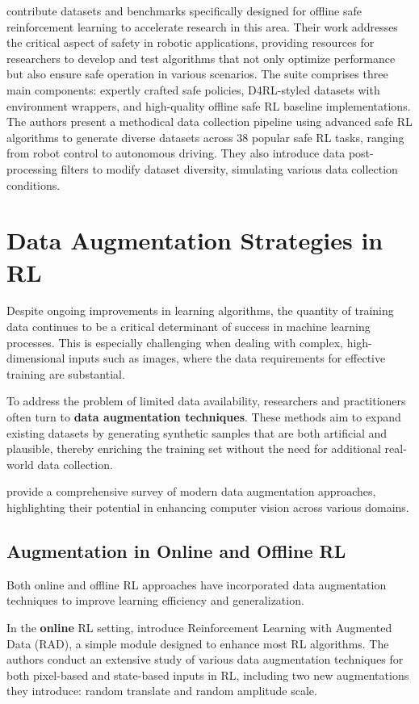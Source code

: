 \cite{liu2023} contribute datasets and benchmarks
specifically designed for offline safe reinforcement learning
to accelerate research in this area.
Their work addresses the critical aspect of safety in robotic
applications, providing resources for researchers to develop and
test algorithms that not only optimize performance but also ensure
safe operation in various scenarios. The suite comprises three
main components: expertly crafted safe policies, D4RL-styled
datasets with environment wrappers, and high-quality offline
safe RL baseline implementations. The authors present a methodical
data collection pipeline using advanced safe RL algorithms to generate
diverse datasets across 38 popular safe RL tasks,
ranging from robot control to autonomous driving.
They also introduce data post-processing filters to
modify dataset diversity, simulating various data collection conditions.

\section{Data Augmentation Strategies in RL}

Despite ongoing improvements in learning algorithms,
the quantity of training data continues to be a critical
determinant of success in machine learning processes.
This is especially challenging when dealing with complex,
high-dimensional inputs such as images, where the data requirements
for effective training are substantial.

To address the problem of limited data availability,
researchers and practitioners often turn to
\textbf{data augmentation techniques}.
These methods aim to expand existing datasets by generating
synthetic samples that are both artificial and plausible,
thereby enriching the training set without the need
for additional real-world data collection.

\cite{mumini2022} provide a comprehensive survey of modern data
augmentation approaches, highlighting their potential in
enhancing computer vision across various domains.

\subsection{Augmentation in Online and Offline RL}

Both online and offline RL approaches have incorporated data
augmentation techniques to improve learning efficiency and generalization.

In the \textbf{online} RL setting, \cite{laskin2020}
introduce Reinforcement Learning with Augmented Data (RAD), 
a simple module designed to enhance most RL algorithms.
The authors conduct an extensive study of various data augmentation
techniques for both pixel-based and state-based inputs in RL, including
two new augmentations they introduce: random translate and random
amplitude scale.

